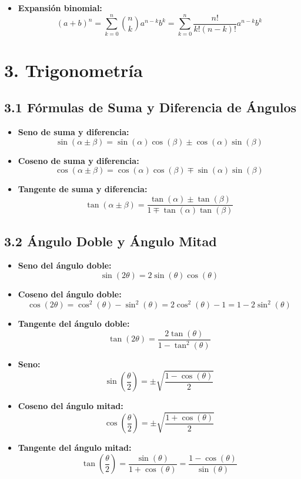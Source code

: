 \documentclass[11pt,a4paper]{article}
\begin{document}
\begin{itemize}
  \item \textbf{Expansión binomial:}
  \[
    (a + b)^n = \sum_{k=0}^n \binom{n}{k} a^{n - k} b^k = \sum_{k=0}^n \frac{n!}{k!(n - k)!} a^{n - k} b^k
  \]
\end{itemize}

\section*{3. Trigonometría}

\subsection*{3.1 Fórmulas de Suma y Diferencia de Ángulos}

\begin{itemize}
  \item \textbf{Seno de suma y diferencia:}
  \[
    \sin(\alpha \pm \beta) = \sin(\alpha)\cos(\beta) \pm \cos(\alpha)\sin(\beta)
  \]
  \item \textbf{Coseno de suma y diferencia:}
  \[
    \cos(\alpha \pm \beta) = \cos(\alpha)\cos(\beta) \mp \sin(\alpha)\sin(\beta)
  \]
  \item \textbf{Tangente de suma y diferencia:}
  \[
    \tan(\alpha \pm \beta) = \frac{\tan(\alpha) \pm \tan(\beta)}{1 \mp \tan(\alpha)\tan(\beta)}
  \]
\end{itemize}

\subsection*{3.2 Ángulo Doble y Ángulo Mitad}

\begin{itemize}
  \item \textbf{Seno del ángulo doble:}
  \[
    \sin(2\theta) = 2\sin(\theta)\cos(\theta)
  \]
  \item \textbf{Coseno del ángulo doble:}
  \[
    \cos(2\theta) = \cos^2(\theta) - \sin^2(\theta) = 2\cos^2(\theta) - 1 = 1 - 2\sin^2(\theta)
  \]
  \item \textbf{Tangente del ángulo doble:}
  \[
    \tan(2\theta) = \frac{2\tan(\theta)}{1 - \tan^2(\theta)}
  \]
  \item \textbf{Seno:}
  \[
    \sin\left(\frac{\theta}{2}\right) = \pm \sqrt{\frac{1 - \cos(\theta)}{2}}
  \]
  \item \textbf{Coseno del ángulo mitad:}
  \[
    \cos\left(\frac{\theta}{2}\right) = \pm \sqrt{\frac{1 + \cos(\theta)}{2}}
  \]
  \item \textbf{Tangente del ángulo mitad:}
  \[
    \tan\left(\frac{\theta}{2}\right) = \frac{\sin(\theta)}{1 + \cos(\theta)} = \frac{1 - \cos(\theta)}{\sin(\theta)}
  \]
\end{itemize}
\end{document}
